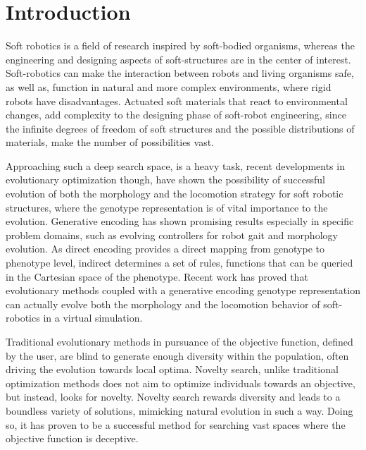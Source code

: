 
\chapter{Introduction} %

\label{Chapter1} %



Soft robotics is a field of research inspired by soft-bodied organisms, whereas the engineering and designing aspects of soft-structures are in the center of interest. Soft-robotics can make the interaction between robots and living organisms safe, as well as, function in natural and more complex environments, where rigid robots have disadvantages. Actuated soft materials that react to environmental changes, add complexity to the designing phase of soft-robot engineering, since the infinite degrees of freedom of soft structures and the possible distributions of materials, make the number of possibilities vast.

Approaching such a deep search space, is a heavy task, recent developments in evolutionary optimization though, have shown the possibility of successful evolution of both the morphology and the locomotion strategy for soft robotic structures, where the genotype representation is of vital importance to the evolution. Generative encoding has shown promising results especially in specific problem domains, such as evolving controllers for robot gait and morphology evolution. As direct encoding provides a direct mapping from genotype to phenotype level, indirect determines a set of rules, functions that can be queried in the Cartesian space of the phenotype. Recent work has proved that evolutionary methods coupled with a generative encoding genotype representation can actually evolve both the morphology and the locomotion behavior of soft-robotics in a virtual simulation.

Traditional evolutionary methods in pursuance of the objective function, defined by the user, are blind to generate enough diversity within the population, often driving the evolution towards local optima. Novelty search, unlike traditional optimization methods does not aim to optimize individuals towards an objective, but instead, looks for novelty. Novelty search rewards diversity and leads to a boundless variety of solutions, mimicking natural evolution in such a way. Doing so, it has proven to be a successful method for searching vast spaces where the objective function is deceptive.

